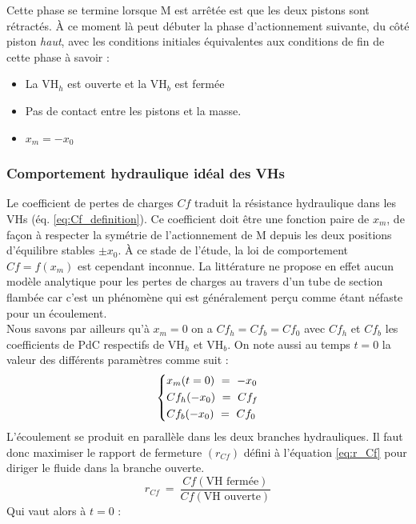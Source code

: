 Cette phase se termine lorsque M est arrêtée est que les deux pistons sont rétractés. À ce moment là peut débuter la phase d'actionnement suivante, du côté piston \emph{haut}, avec les conditions initiales équivalentes aux conditions de fin de cette phase à savoir :
\begin{itemize}[label=$\bullet$]
	\item La VH$_h$ est ouverte et la VH$_b$ est fermée
 	\item Pas de contact entre les pistons et la masse.
	\item $x_m=-x_0$
\end{itemize}
	\subsubsection{Comportement hydraulique idéal des VHs}
	\label{subsubsec:2.5.2.a:Comportement hydraulique cible des VHs}
Le coefficient de pertes de charges $Cf$ traduit la résistance hydraulique dans les VHs (éq. \ref{eq:Cf_definition}). Ce coefficient doit être une fonction paire de $x_m$, de façon à respecter la symétrie de l'actionnement de M depuis les deux positions d'équilibre stables $\pm x_0$. À ce stade de l'étude, la loi de comportement $Cf=f(x_m)$ est cependant inconnue. La littérature ne propose en effet aucun modèle analytique pour les pertes de charges au travers d'un tube de section flambée car c'est un phénomène qui est généralement perçu comme étant néfaste pour un écoulement.\\
Nous savons par ailleurs qu'à $x_m=0$ on a $Cf_h = Cf_b = Cf_0$ avec $Cf_h$ et $Cf_b$ les coefficients de PdC respectifs de VH$_h$ et VH$_b$. On note aussi au temps $t=0$ la valeur des différents paramètres comme suit :
\begin{equation}
\begin{dcases}
x_m(t=0)\ =\ -x_0\\
Cf_h(-x_0)\ =\ Cf_f\\
Cf_b(-x_0)\ =\ Cf_0
\end{dcases}
\end{equation}
L'écoulement se produit en parallèle dans les deux branches hydrauliques. Il faut donc maximiser le rapport de fermeture $(r_{Cf})$ défini à l'équation \ref{eq:r_Cf} pour diriger le fluide dans la branche ouverte.
\begin{equation}
r_{Cf}\ =\ \frac{Cf(\text{VH fermée})}{Cf(\text{VH ouverte})}
\label{eq:r_Cf}
\end{equation}
Qui vaut alors à $t=0$ :
